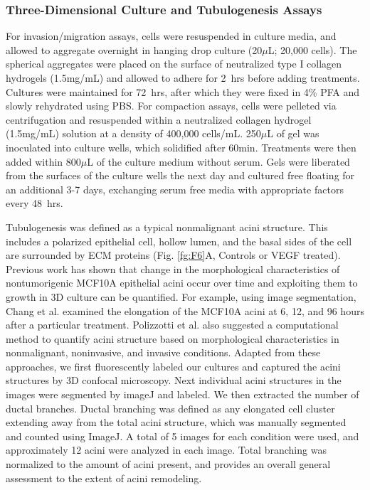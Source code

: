 \documentclass[11pt,letterpaper]{article}
\begin{document}
\subsubsection*{Three-Dimensional Culture and Tubulogenesis Assays}
For invasion/migration assays, cells were resuspended in culture media, and allowed to aggregate overnight in hanging drop culture (20$\mu$L; 20,000 cells). The spherical aggregates were placed on the surface of neutralized type I collagen hydrogels (1.5mg/mL) and allowed to adhere for 2~hrs before adding treatments. Cultures were maintained for 72~hrs, after which they were fixed in 4\% PFA and slowly rehydrated using PBS. For compaction assays, cells were pelleted via centrifugation and resuspended within a neutralized collagen hydrogel (1.5mg/mL) solution at a density of 400,000 cells/mL.  250$\mu$L of gel was inoculated into culture wells, which solidified after 60min. Treatments were then added within 800$\mu$L of the culture medium without serum. Gels were liberated from the surfaces of the culture wells the next day and cultured free floating for an additional 3-7 days, exchanging serum free media with appropriate factors every 48~hrs.

Tubulogenesis was defined as a typical nonmalignant acini structure.
This includes a polarized epithelial cell, hollow lumen, and the basal sides of the cell are surrounded by ECM proteins (Fig. \ref{fg:F6}A, Controls or VEGF treated). Previous work has shown that change in the morphological
characteristics of nontumorigenic MCF10A epithelial acini occur over time and exploiting them to growth in 3D culture can be quantified.
For example, using image segmentation, Chang et al. \cite{ChangPP07} examined the elongation of the MCF10A acini at 6, 12, and 96 hours after a particular treatment.
Polizzotti et al. \cite{Polizzotti} also suggested a computational method to quantify acini structure based on morphological characteristics in nonmalignant, noninvasive, and invasive conditions.
Adapted from these approaches, we first fluorescently labeled our cultures and captured the acini structures by 3D confocal microscopy.
Next individual acini structures in the images were segmented by imageJ and labeled.
We then extracted the number of ductal branches. Ductal branching was defined as any elongated cell cluster extending away from the total acini structure, which was manually segmented and counted using ImageJ.
A total of 5 images for each condition were used, and approximately 12 acini were analyzed in each image.
Total branching was normalized to the amount of acini present, and provides an overall general assessment to the extent of acini remodeling.
\end{document}
